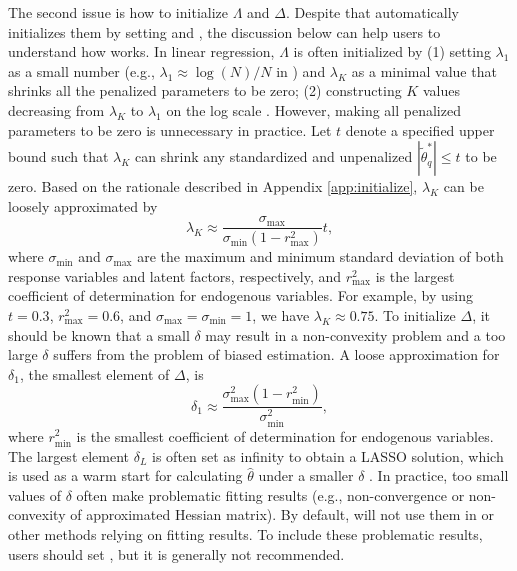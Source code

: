 \documentclass[nojss]{jss}
\begin{document}
The second issue is how to initialize $\Lambda$ and $\Delta$. Despite that  automatically initializes them by setting  and , the discussion below can help users to understand how  works. In linear regression, $\Lambda$ is often initialized by (1) setting $\lambda_1$ as a small number (e.g., $\lambda_1 \approx \log(N)/N$ in ) and $\lambda_K$ as a minimal value that shrinks all the penalized parameters to be zero; (2) constructing $K$ values decreasing from $\lambda_K$ to $\lambda_1$ on the log scale \citep[e.g.,][]{Friedman2010}. However, making all penalized parameters to be zero is unnecessary in practice. Let $t$ denote a specified upper bound such that $\lambda_K$ can shrink any standardized and unpenalized $|\tilde{\theta}_q^*| \leq t$ to be zero. Based on the rationale described in Appendix \ref{app:initialize}, $\lambda_K$ can be loosely approximated by 
\begin{equation} \label{eq:lower_bound_lambda}
\lambda_K \approx \frac{\sigma_\text{max}}{ \sigma_\text{min}(1-r_\text{max}^2) }t,
\end{equation}
where $\sigma_\text{min}$ and $\sigma_\text{max}$ are the maximum and minimum standard deviation of both response variables and latent factors, respectively, and $r_\text{max}^2$ is the largest coefficient of determination for endogenous variables. For example, by using $t = 0.3$, $r_\text{max}^2= 0.6$, and $\sigma_\text{max}=\sigma_\text{min}=1$, we have $\lambda_K \approx 0.75$. To initialize $\Delta$, it should be known that a small $\delta$ may result in a non-convexity problem and a too large $\delta$ suffers from the problem of biased estimation. A loose approximation for $\delta_1$, the smallest element of $\Delta$, is
\begin{equation} \label{eq:lower_bound_delta}
\delta_1 \approx \frac{  \sigma_\text{max}^2(1-r_\text{min}^2)}{\sigma_\text{min}^2 },
\end{equation}
where $r_\text{min}^2$ is the smallest coefficient of determination for endogenous variables. The largest element $\delta_L$ is often set as infinity to obtain a LASSO solution, which is used as a warm start for calculating $\hat{\theta}$ under a smaller $\delta$ \citep[see][]{Mazumder2011}. In practice, too small values of $\delta$ often make problematic fitting results (e.g., non-convergence or non-convexity of approximated Hessian matrix). By default,  will not use them in  or other methods relying on fitting results. To include these problematic results, users should set , but it is generally not recommended.
\end{document}

